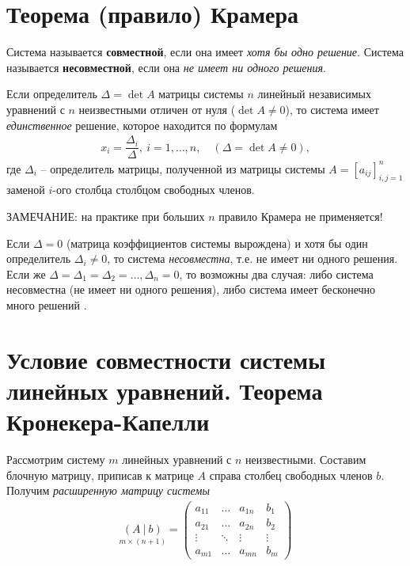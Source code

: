 \documentclass[%
	11pt,
	a4paper,
	utf8,
		]{article}
\begin{document}
\section{Теорема (правило) Крамера}

Система называется \textbf{совместной}, если она имеет \emph{хотя бы одно решение}. Система называется \textbf{несовместной}, если она \emph{не имеет ни одного решения}.

Если определитель $ \Delta = \det A $ матрицы системы $ n $ линейный независимых уравнений с $ n $ неизвестными отличен от нуля ($ \det A \neq 0 $), то система имеет \emph{единственное} решение, которое находится по формулам
\begin{align*}
	x_i = \dfrac{ \Delta_i }{ \Delta }, \ i = 1,\ldots, n, \quad (\Delta = \det A \neq 0),
\end{align*}
где $ \Delta_i $ -- определитель матрицы, полученной из матрицы системы $ A = [a_{ij}]_{i,j=1}^n $ заменой $ i $-ого столбца столбцом свободных членов.

ЗАМЕЧАНИЕ: на практике при больших $ n $ правило Крамера не применяется!

Если $ \Delta = 0 $ (матрица коэффициентов системы вырождена) и хотя бы один определитель $ \Delta_i \neq 0 $, то система \emph{несовместна}, т.е. не имеет ни одного решения. Если же $ \Delta = \Delta_1 = \Delta_2 = \ldots, \Delta_n = 0 $, то возможны два случая: либо система несовместна (не имеет ни одного решения), либо система имеет бесконечно много решений \cite[]{bortakovskiy:2005}.

\section{Условие совместности системы линейных уравнений. Теорема Кронекера-Капелли}

Рассмотрим систему $ m $ линейных уравнений с $ n $ неизвестными. Составим блочную матрицу, приписав к матрице $ A $ справа столбец свободных членов $ b $. Получим \emph{расширенную матрицу системы}
\begin{align*}
	\underset{m \times (n + 1)}{(  A \ | \ b )} =
	  \begin{pmatrix}
	  	  a_{11} & \dots & a_{1n} &  b_1\\
	  	  a_{21} & \dots & a_{2n}  & b_2 \\
	  	  \vdots  & \ddots & \vdots & \vdots \\
	  	  a_{m1} & \dots & a_{mn} & b_m
	  \end{pmatrix}
\end{align*}
\end{document}
